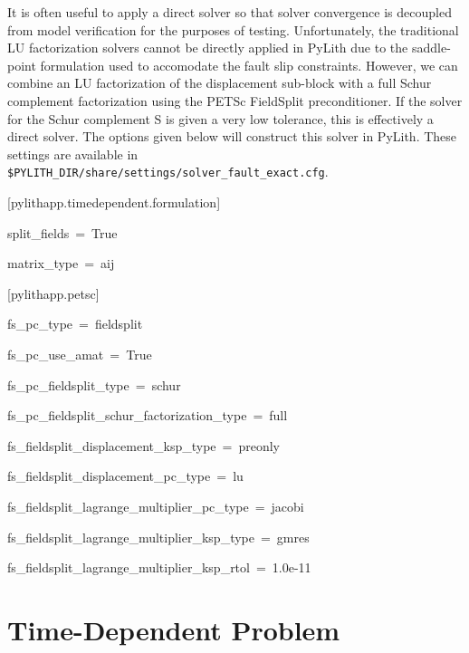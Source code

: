 It is often useful to apply a direct solver so that solver convergence
is decoupled from model verification for the purposes of testing.
Unfortunately, the traditional LU factorization solvers cannot be
directly applied in PyLith due to the saddle-point formulation used
to accomodate the fault slip constraints. However, we can combine
an LU factorization of the displacement sub-block with a full Schur
complement factorization using the PETSc FieldSplit preconditioner.
If the solver for the Schur complement S is given a very low tolerance,
this is effectively a direct solver. The options given below will
construct this solver in PyLith. These settings are available in\texttt{}~\\
\texttt{\$PYLITH\_DIR/share/settings/solver\_fault\_exact.cfg}.
\begin{lyxcode}
{[}pylithapp.timedependent.formulation{]}

split\_fields~=~True

matrix\_type~=~aij



{[}pylithapp.petsc{]}

fs\_pc\_type~=~fieldsplit

fs\_pc\_use\_amat~=~True

fs\_pc\_fieldsplit\_type~=~schur

fs\_pc\_fieldsplit\_schur\_factorization\_type~=~full

fs\_fieldsplit\_displacement\_ksp\_type~=~preonly

fs\_fieldsplit\_displacement\_pc\_type~=~lu

fs\_fieldsplit\_lagrange\_multiplier\_pc\_type~=~jacobi

fs\_fieldsplit\_lagrange\_multiplier\_ksp\_type~=~gmres

fs\_fieldsplit\_lagrange\_multiplier\_ksp\_rtol~=~1.0e-11
\end{lyxcode}

\section{Time-Dependent Problem}

